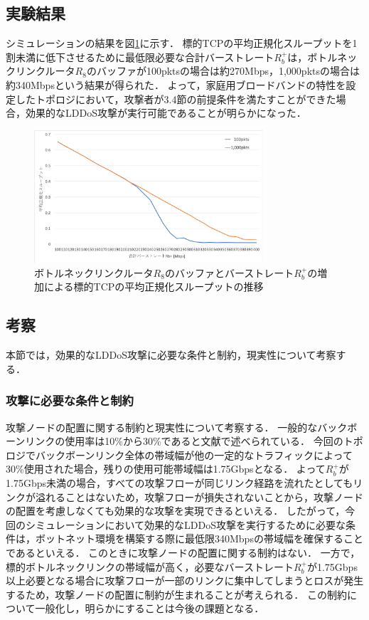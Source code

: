 \documentclass[Japanese]{dicomopapers}
\begin{document}
\subsection{実験結果}
シミュレーションの結果を図\ref{fig:exp01-result}に示す．
標的TCPの平均正規化スループットを1割未満に低下させるために最低限必要な合計バーストレート$R_{b}^+$は，ボトルネックリンクルータ$R_{8}$のバッファが100pktsの場合は約270Mbps，1,000pktsの場合は約340Mbpsという結果が得られた．
よって，家庭用ブロードバンドの特性を設定したトポロジにおいて，攻撃者が3.4節の前提条件を満たすことができた場合，効果的なLDDoS攻撃が実行可能であることが明らかになった．

\begin{figure}[tb]
    \begin{center}
        \includegraphics[clip,width=8.5cm]{images/exp01-result.png}
        \caption{ボトルネックリンクルータ$R_{8}$のバッファとバーストレート$R_{b}^+$の増加による標的TCPの平均正規化スループットの推移}
        \label{fig:exp01-result}
    \end{center}
\end{figure}

\subsection{考察}
本節では，効果的なLDDoS攻撃に必要な条件と制約，現実性について考察する．

\subsubsection{攻撃に必要な条件と制約}
攻撃ノードの配置に関する制約と現実性について考察する．
一般的なバックボーンリンクの使用率は10\%から30\%であると文献\cite{sizing-router-buffers}で述べられている．
今回のトポロジでバックボーンリンク全体の帯域幅が他の一定的なトラフィックによって30\%使用された場合，残りの使用可能帯域幅は1.75Gbpsとなる．
よって$R_{b}^+$が1.75Gbps未満の場合，すべての攻撃フローが同じリンク経路を流れたとしてもリンクが溢れることはないため，攻撃フローが損失されないことから，攻撃ノードの配置を考慮しなくても効果的な攻撃を実現できるといえる．
したがって，今回のシミュレーションにおいて効果的なLDDoS攻撃を実行するために必要な条件は，ボットネット環境を構築する際に最低限340Mbpsの帯域幅を確保することであるといえる．
このときに攻撃ノードの配置に関する制約はない．
一方で，標的ボトルネックリンクの帯域幅が高く，必要なバーストレート$R_{b}^+$が1.75Gbps以上必要となる場合に攻撃フローが一部のリンクに集中してしまうとロスが発生するため，攻撃ノードの配置に制約が生まれることが考えられる．
この制約について一般化し，明らかにすることは今後の課題となる．
\end{document}
